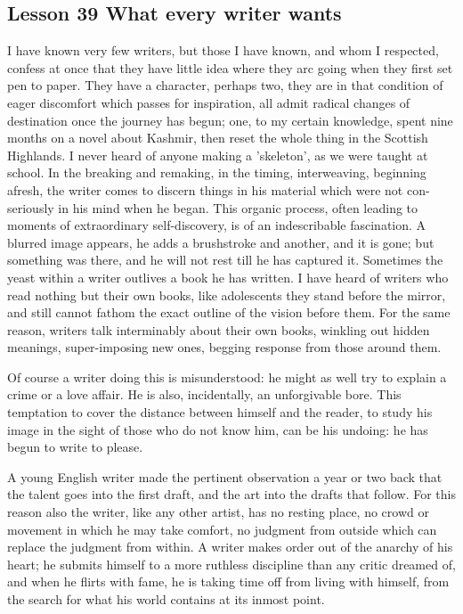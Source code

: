 \documentclass[kindlepaper]{BHCexam4kindle}
\begin{document}
\subsection{Lesson 39 
What every writer wants}
\par
I have known very few writers, but those I have known, and whom I respected,
confess at once that they have little idea where they arc going when they first set
pen to paper. They have a character, perhaps two, they are in that condition of
eager discomfort which passes for inspiration, all admit radical changes of
destination once the journey has begun; one, to my certain knowledge, spent nine
months on a novel about Kashmir, then reset the whole thing in the Scottish
Highlands. I never heard of anyone making a 'skeleton', as we were taught at
school. In the breaking and remaking, in the timing, interweaving, beginning
afresh, the writer comes to discern things in his material which were not con-
seriously in his mind when he began. This organic process, often leading to
moments of extraordinary self-discovery, is of an indescribable fascination. A
blurred image appears, he adds a brushstroke and another, and it is gone; but
something was there, and he will not rest till he has captured it. Sometimes the
yeast within a writer outlives a book he has written. I have heard of writers who
read nothing but their own books, like adolescents they stand before the mirror,
and still cannot fathom the exact outline of the vision before them. For the same
reason, writers talk interminably about their own books, winkling out hidden
meanings, super-imposing new ones, begging response from those around them.
\par
Of course a writer doing this is misunderstood: he might as well try to explain a
crime or a love affair. He is also, incidentally, an unforgivable bore.
This temptation to cover the distance between himself and the reader, to
study his image in the sight of those who do not know him, can be his undoing:
he has begun to write to please.
\par
A young English writer made the pertinent observation a year or two back
that the talent goes into the first draft, and the art into the drafts that follow. For
this reason also the writer, like any other artist, has no resting place, no crowd or
movement in which he may take comfort, no judgment from outside which can
replace the judgment from within. A writer makes order out of the anarchy of
his heart; he submits himself to a more ruthless discipline than any critic dreamed
of, and when he flirts with fame, he is taking time off from living with himself,
from the search for what his world contains at its inmost point.
\clearpage
\end{document}
